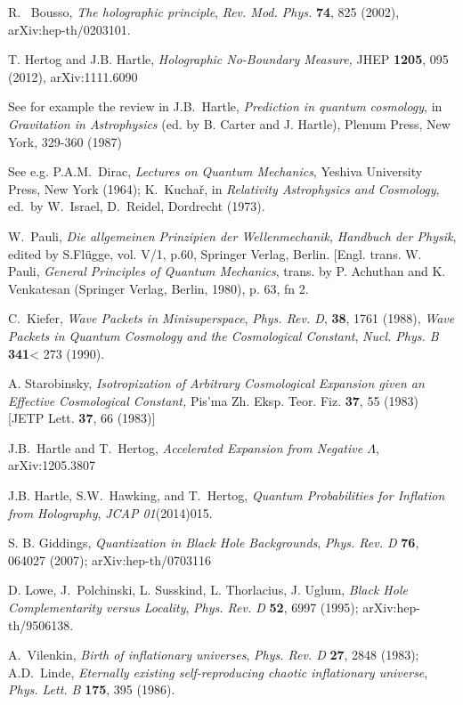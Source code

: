 \documentclass[prd,floats,superscriptaddress,eqsecnum,floatfix,nofootinbib,12pt]{revtex4}
\newcommand{\ttle}[1]{{\it #1}}
\begin{document}
{{{{\begin{thebibliography}{99}
  R.~ Bousso, {\it The holographic principle}, {\sl Rev. Mod. Phys.} {\bf 74}, 825 (2002), arXiv:hep-th/0203101.

 T. Hertog and J.B. Hartle, \ttle{\it Holographic No-Boundary Measure, }JHEP {\bf 1205}, 095 (2012), arXiv:1111.6090

  See for example the review in J.B.~Hartle,  {\it Prediction in quantum cosmology}, in {\it Gravitation in Astrophysics} (ed. by B. Carter and J. Hartle), Plenum Press, New York, 329-360 (1987)

 See e.g. P.A.M.~Dirac, {\sl Lectures on Quantum Mechanics}, Yeshiva
University Press, New York (1964); K.~Kucha\v r, in {\sl Relativity Astrophysics and
Cosmology}, ed.~by W.~Israel, D.~Reidel, Dordrecht (1973).

  W.~Pauli,  {\it  Die allgemeinen Prinzipien der Wellenmechanik,} {\sl Handbuch der Physik}, edited by S.Fl\"ugge, vol. V/1, p.60, Springer Verlag, Berlin. [Engl. trans.  W. Pauli, {\it General Principles of Quantum Mechanics}, trans. by P. Achuthan and K. Venkatesan (Springer Verlag, Berlin, 1980), p. 63, fn 2.

 C.~Kiefer, {\it Wave Packets in Minisuperspace}, {\sl Phys. Rev. D}, {\bf 38}, 1761 (1988), {\it Wave Packets in Quantum Cosmology and the Cosmological Constant}, {\sl Nucl. Phys. B} {\bf 341}< 273 (1990). 

A. Starobinsky, \ttle{\it Isotropization of Arbitrary Cosmological Expansion given an Effective Cosmological Constant, }Pis'ma Zh. Eksp. Teor. Fiz. {\bf 37}, 55 (1983) [JETP Lett. {\bf 37}, 66 (1983)]

  J.B.~Hartle and T.~Hertog, \ttle{\it Accelerated Expansion from Negative $\Lambda$}, arXiv:1205.3807

  J.B. Hartle, S.W.~Hawking, and T.~Hertog, {\it Quantum Probabilities for Inflation from Holography}, {\sl JCAP 01}(2014)015. 

 S. B. Giddings, {\it Quantization in Black Hole Backgrounds}, {\sl Phys. Rev. D} {\bf 76}, 064027 (2007); arXiv:hep-th/0703116

 D. Lowe, J.~Polchinski, L. Susskind, L. Thorlacius, J. Uglum, {\it Black Hole Complementarity versus Locality}, {\sl Phys. Rev. D} {\bf 52}, 6997 (1995); arXiv:hep-th/9506138.

A.~Vilenkin, {\it Birth of inflationary universes}, {\sl Phys. Rev. D} {\bf 27}, 2848 (1983);
A.D.~Linde, {\it Eternally existing self-reproducing chaotic inflationary universe}, 
{\sl Phys. Lett. B} {\bf 175}, 395 (1986).


\end{thebibliography}}}}}
\end{document}
